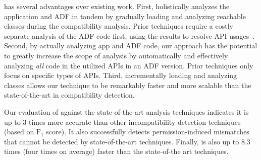 
\@approach has several advantages over existing work.
First, \@approach holistically analyzes the application and ADF in tandem by gradually loading and analyzing reachable classes during the compatibility analysis.
Prior techniques require a costly separate analysis of the ADF code first, using the results to resolve API usages~\cite{huang2018understanding,linttips, lili2018cid}. 
Second, by actually analyzing app and ADF code, our approach has the potential to greatly increase the scope of analysis by automatically and effectively analyzing \emph{all} code in the utilized APIs in an ADF version.  
Prior techniques only focus on specific types of APIs.  
Third, incrementally loading and analyzing classes allows our technique to be remarkably faster and more scalable than the state-of-the-art in compatibility detection.  


Our evaluation of \@approach against the state-of-the-art analysis techniques indicates it is up to 3 times more accurate than other incompatibility detection techniques (based on $\text{F}_1$ score). %
It also successfully detects
permission-induced mismatches that cannot be
detected by state-of-the-art techniques. 
Finally, \@approach is also up to 8.3 times (four times on average)
faster than the state-of-the art techniques. 



